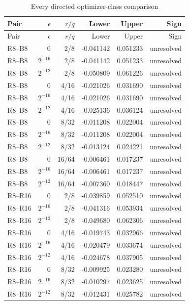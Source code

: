 {\footnotesize\setlength{\tabcolsep}{3pt}
\begin{longtable}{lrrrrr}
\caption{Every directed optimizer-class comparison}\label{tab:all-pairs82}\\
\hline
Pair & $\epsilon$ & $r/q$ & Lower & Upper & Sign \\
\hline
\endfirsthead
\hline
Pair & $\epsilon$ & $r/q$ & Lower & Upper & Sign \\
\hline
\endhead
R8--B8 & $0$ & 2/8 & -0.041142 & 0.051233 & unresolved \\
R8--B8 & $2^{-16}$ & 2/8 & -0.041142 & 0.051233 & unresolved \\
R8--B8 & $2^{-12}$ & 2/8 & -0.050809 & 0.061226 & unresolved \\
R8--B8 & $0$ & 4/16 & -0.021026 & 0.031690 & unresolved \\
R8--B8 & $2^{-16}$ & 4/16 & -0.021026 & 0.031690 & unresolved \\
R8--B8 & $2^{-12}$ & 4/16 & -0.025136 & 0.036124 & unresolved \\
R8--B8 & $0$ & 8/32 & -0.011208 & 0.022004 & unresolved \\
R8--B8 & $2^{-16}$ & 8/32 & -0.011208 & 0.022004 & unresolved \\
R8--B8 & $2^{-12}$ & 8/32 & -0.013124 & 0.024221 & unresolved \\
R8--B8 & $0$ & 16/64 & -0.006461 & 0.017237 & unresolved \\
R8--B8 & $2^{-16}$ & 16/64 & -0.006461 & 0.017237 & unresolved \\
R8--B8 & $2^{-12}$ & 16/64 & -0.007360 & 0.018447 & unresolved \\
R8--R16 & $0$ & 2/8 & -0.039859 & 0.052510 & unresolved \\
R8--R16 & $2^{-16}$ & 2/8 & -0.041316 & 0.053934 & unresolved \\
R8--R16 & $2^{-12}$ & 2/8 & -0.049680 & 0.062306 & unresolved \\
R8--R16 & $0$ & 4/16 & -0.019743 & 0.032966 & unresolved \\
R8--R16 & $2^{-16}$ & 4/16 & -0.020479 & 0.033674 & unresolved \\
R8--R16 & $2^{-12}$ & 4/16 & -0.024678 & 0.037905 & unresolved \\
R8--R16 & $0$ & 8/32 & -0.009925 & 0.023280 & unresolved \\
R8--R16 & $2^{-16}$ & 8/32 & -0.010297 & 0.023625 & unresolved \\
R8--R16 & $2^{-12}$ & 8/32 & -0.012431 & 0.025782 & unresolved \\

\end{longtable}}

